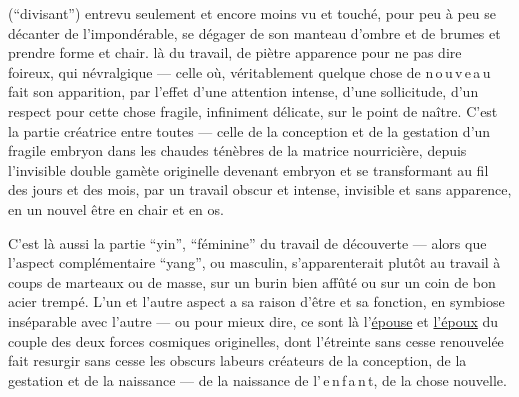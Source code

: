 \hspace{2em}(``\quad divisant\quad '')
entrevu seulement et encore moins vu et touché, pour peu à peu se
décanter de l'impondérable, se dégager de son manteau d'ombre et de brumes et prendre forme et chair.
là du travail,
de piètre apparence pour ne pas dire foireux, qui
névralgique --- celle où, véritablement quelque chose de n\,o\,u\,v\,e\,a\,u fait son apparition,
par l'effet d'une attention intense, d'une sollicitude, d'un respect pour cette chose fragile,
infiniment délicate, sur le point de naître. C'est la partie créatrice entre toutes ---
celle de la conception et de la gestation d'un fragile embryon dans les chaudes ténèbres
de la matrice nourricière,  depuis l'invisible double gamète
 originelle devenant embryon et se transformant au fil des jours et des mois,
par un travail obscur et intense, invisible et sans apparence, en un nouvel être en chair et en os.

C'est là aussi la partie ``yin'', ``féminine\deleted{\unsure{,}}'' du travail de découverte
--- alors que  l'aspect complémentaire ``yang'', ou masculin,
s'apparenterait plutôt  au travail à coups de marteaux ou de masse,
sur un burin bien affûté ou sur un coin de bon acier trempé.
L'un et l'autre aspect a sa raison d'être et sa fonction, en symbiose inséparable  avec l'autre --- ou pour mieux dire, ce sont là l'\uline{épouse} et \uline{l'époux}
du couple des deux forces cosmiques originelles, dont l'étreinte
sans cesse renouvelée fait resurgir sans cesse les obscurs labeurs créateurs de la conception,
de la gestation et de la naissance --- de la naissance de l'\,e\,n\,f\,a\,n\,t, de la chose nouvelle.

